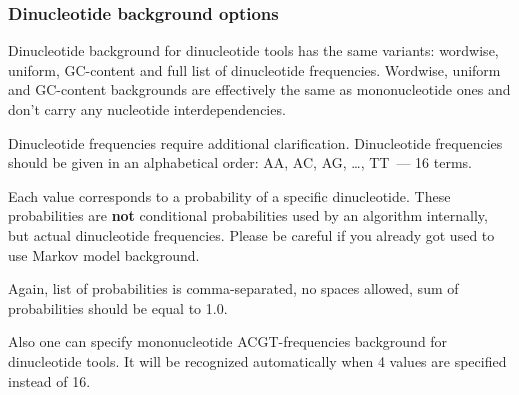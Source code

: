 \subsubsection{Dinucleotide background options}
Dinucleotide background for dinucleotide tools has the same variants: wordwise, uniform, GC-content and full list of dinucleotide frequencies. Wordwise, uniform and GC-content backgrounds are effectively the same as mononucleotide ones and don't carry any nucleotide interdependencies.

Dinucleotide frequencies require additional clarification. Dinucleotide frequencies should be given in an alphabetical order: AA, AC, AG, \dots, TT~--- 16 terms.

Each value corresponds to a probability of a specific dinucleotide. These probabilities are \textbf{not} conditional probabilities used by an algorithm internally, but actual dinucleotide frequencies.
Please be careful if you already got used to use Markov model background.

Again, list of probabilities is comma-separated, no spaces allowed, sum of probabilities should be equal to 1.0.

Also one can specify mononucleotide ACGT-frequencies background for dinucleotide tools. It will be recognized automatically when 4 values are specified instead of 16.
